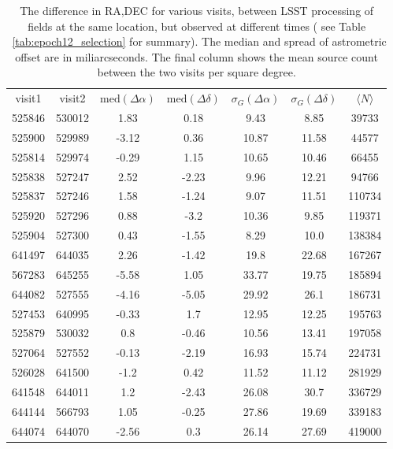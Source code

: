 \documentclass[DM,lsstdraft,toc,usenatbib]{lsstdoc}
\begin{document}
\begin{table}
\centering
\caption{The difference in RA,DEC for various visits, between LSST processing of fields at the same location, but observed at different times ( see Table ~\ref{tab:epoch12_selection} for summary). The median and spread of astrometric offset are in  miliarcseconds. The final column shows the mean source count between the two visits per square degree. }
\label{tab:radec_lsst_lsst}
\begin{tabular}{ccccccc}
visit1 & visit2 & $\mathrm{med}(\Delta\alpha)$ & $\mathrm{med}(\Delta\delta)$ & $\sigma_{G}(\Delta\alpha)$ & $\sigma_{G}(\Delta\delta)$ & $\langle N \rangle$ \\
525846 & 530012 & 1.83 & 0.18 & 9.43 & 8.85 & 39733 \\
525900 & 529989 & -3.12 & 0.36 & 10.87 & 11.58 & 44577 \\
525814 & 529974 & -0.29 & 1.15 & 10.65 & 10.46 & 66455 \\
525838 & 527247 & 2.52 & -2.23 & 9.96 & 12.21 & 94766 \\
525837 & 527246 & 1.58 & -1.24 & 9.07 & 11.51 & 110734 \\
525920 & 527296 & 0.88 & -3.2 & 10.36 & 9.85 & 119371 \\
525904 & 527300 & 0.43 & -1.55 & 8.29 & 10.0 & 138384 \\
641497 & 644035 & 2.26 & -1.42 & 19.8 & 22.68 & 167267 \\
567283 & 645255 & -5.58 & 1.05 & 33.77 & 19.75 & 185894 \\
644082 & 527555 & -4.16 & -5.05 & 29.92 & 26.1 & 186731 \\
527453 & 640995 & -0.33 & 1.7 & 12.95 & 12.25 & 195763 \\
525879 & 530032 & 0.8 & -0.46 & 10.56 & 13.41 & 197058 \\
527064 & 527552 & -0.13 & -2.19 & 16.93 & 15.74 & 224731 \\
526028 & 641500 & -1.2 & 0.42 & 11.52 & 11.12 & 281929 \\
641548 & 644011 & 1.2 & -2.43 & 26.08 & 30.7 & 336729 \\
644144 & 566793 & 1.05 & -0.25 & 27.86 & 19.69 & 339183 \\
644074 & 644070 & -2.56 & 0.3 & 26.14 & 27.69 & 419000 \\
\end{tabular}
\end{table}
\end{document}
